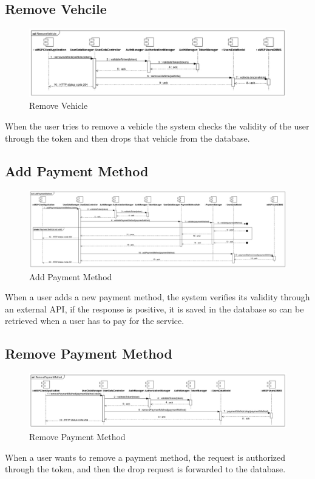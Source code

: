 \documentclass{Configuration_Files/PoliMi3i_thesis}
\begin{document}
\subsection{Remove Vehcile}
\begin{figure}[H]
    \centering
    \includegraphics[width=1\textwidth]{Images/sequenceDiagrams/RemoveVehicle.jpg}
    \caption{Remove Vehicle}
\end{figure}
When the user tries to remove a vehicle the system checks the validity of the user through the token and then drops that vehicle from the database.

\subsection{Add Payment Method}
\begin{figure}[H]
    \centering
    \includegraphics[width=1\textwidth]{Images/sequenceDiagrams/AddPaymentMethod.jpg}
    \caption{Add Payment Method}
\end{figure}
When a user adds a new payment method, the system verifies its validity through an external API, if the response is positive, it is saved in the database so can be retrieved when a user has to pay for the service.

\subsection{Remove Payment Method}
\begin{figure}[H]
    \centering
    \includegraphics[width=1\textwidth]{Images/sequenceDiagrams/RemovePaymentMethod.jpg}
    \caption{Remove Payment Method}
\end{figure}
When a user wants to remove a payment method, the request is authorized through the token, and then the drop request is forwarded to the database.
\end{document}

